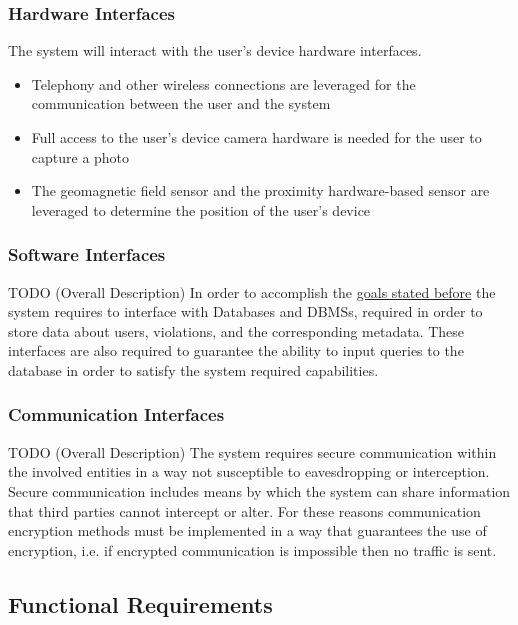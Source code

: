 \clearpage

\subsubsection{Hardware Interfaces}

The system will interact with the user's device hardware interfaces.	
	\begin{itemize} 
		\item Telephony and other wireless connections are leveraged for the communication between the user and the system
		\item Full access to the user's device camera hardware is needed for the user to capture a photo
		\item The geomagnetic field sensor and the proximity hardware-based sensor are leveraged to determine the position of the user's device
	\end{itemize}
	
\subsubsection{Software Interfaces}

TODO (Overall Description) In order to accomplish the \hyperref[sec:goals]{goals stated before} the system requires to interface with Databases and DBMSs, required in order to store data about users, violations, and the corresponding metadata. These interfaces are also required to guarantee the ability to input queries to the database in order to satisfy the system required capabilities.


\subsubsection{Communication Interfaces}

TODO (Overall Description) The system requires secure communication within the involved entities in a way not susceptible to eavesdropping or interception. Secure communication includes means by which the system can share information that third parties cannot intercept or alter. For these reasons communication encryption methods must be implemented in a way that guarantees the use of encryption, i.e. if encrypted communication is impossible then no traffic is sent.

\clearpage

\subsection{Functional Requirements}

